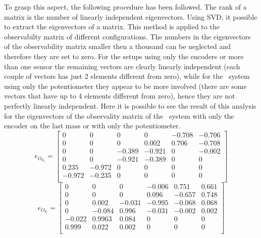 To grasp this aspect, the following procedure has been followed. The rank of a matrix is the number of linearly independent eigenvectors.
\label{SVD_explaination}
Using SVD, it possible to extract the eigenvectors of a matrix. This method is applied to the observabilty matrix of different configurations. The numbers in the eigenvectors of the observability matrix smaller then a thousand can be neglected and therefore they are set to zero. For the setups using only the encoders or more than one sensor the remaining vectors are clearly linearly independent (each couple of vectors has just 2 elements different from zero), while for the \twodof\ system using only the potentiometer they appear to be more involved (there are some vectors that have up to 4 elements different from zero), hence they are not perfectly linearly independent.
Here it is possible to see the result of this analysis for the eigenvectors of the observality matrix of the \twodof\ system with only the encoder on the last mass or with only the potentiometer. 
\begin{equation}
	e_{O_{\theta_{2}}}= \begin{bmatrix}
		0& 0 & 0 & 0 		& -0.708 & -0.706 \\
		0& 0 & 0 & 0.002 &  0.706 & -0.708 \\
		0& 0 & -0.389 & -0.921 & 0 & -0.002 \\
		0& 0 & -0.921 & -0.389 & 0 & 0 \\
		0.235 & -0.972 & 0 & 0 & 0 & 0 \\
		-0.972 & -0.235 & 0 & 0 & 0 & 0 \\
	\end{bmatrix}
\end{equation}
\begin{equation}
	e_{O_{\theta_{l}}}= \begin{bmatrix}
		0& 0 & 0 & -0.006  & 0.751 & 0.661 \\
		0& 0 & 0 & 0.096 &  -0.657 & 0.748 \\
		0& 0.002 & -0.031 & -0.995 & -0.068 & 0.068 \\
		0& -0.084 & 0.996 & -0.031 & -0.002& 0.002 \\
		-0.022 & 0.9963 & 0.084 & 0 & 0 & 0 \\
		0.999 & 0.022 & 0.002 & 0 & 0 & 0 \\
	\end{bmatrix}
\end{equation}
